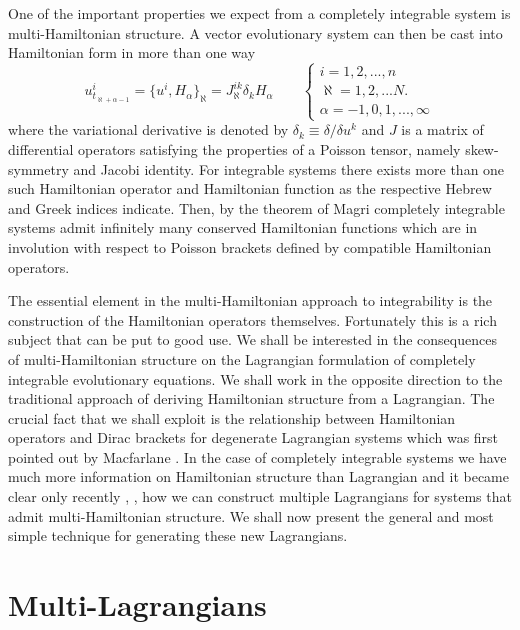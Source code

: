\documentclass[a4paper,12pt]{article}
\begin{document}
One of the important properties we expect from a completely
integrable system is multi-Hamiltonian structure. A vector
evolutionary system can then be cast into Hamiltonian form in more
than one way
\begin{equation}
u^i_{t_{\aleph+\alpha-1}} = \{u^i, H_\alpha \}_\aleph =
 J^{ik}_{\aleph}  \delta_k H_\alpha \qquad
\left\{ \begin{array}{l} i=1,2,...,n \\ \aleph=1,2,... N. \\
\alpha=-1,0,1,..., \infty
\end{array} \right. \label{hameq}
\end{equation}
where the variational derivative is denoted by $\delta_k\equiv
\delta /\delta u^k$ and $J$ is a matrix of differential operators
satisfying the properties of a Poisson tensor, namely
skew-symmetry and Jacobi identity. For integrable systems there
exists more than one such Hamiltonian operator
and Hamiltonian function as the respective Hebrew and Greek
indices indicate. Then, by the theorem of Magri \cite{magri}
completely integrable systems admit infinitely many conserved
Hamiltonian functions which are in involution with respect to Poisson
brackets defined by compatible Hamiltonian operators.

The essential element in the multi-Hamiltonian approach to
integrability is the construction of the Hamiltonian operators
themselves. Fortunately this is a rich subject \cite{dorfman} that
can be put to good use. We shall be interested in the consequences
of multi-Hamiltonian structure on the Lagrangian formulation of
completely integrable evolutionary equations. We shall work in the
opposite direction to the traditional approach of deriving
Hamiltonian structure from a Lagrangian. The crucial fact that we
shall exploit is the relationship between Hamiltonian operators
and Dirac brackets \cite{dirac} for degenerate Lagrangian systems
which was first pointed out by Macfarlane \cite{mac}. In the case
of completely integrable systems we have much more information on
Hamiltonian structure than Lagrangian and it became clear only
recently \cite{pavlov}, \cite{nhepth}, \cite{pavlov2} how we can
construct multiple Lagrangians for systems that admit
multi-Hamiltonian structure. We shall now present the general and
most simple technique for generating these new Lagrangians.

\section{Multi-Lagrangians}
\label{sec-main}
\end{document}
